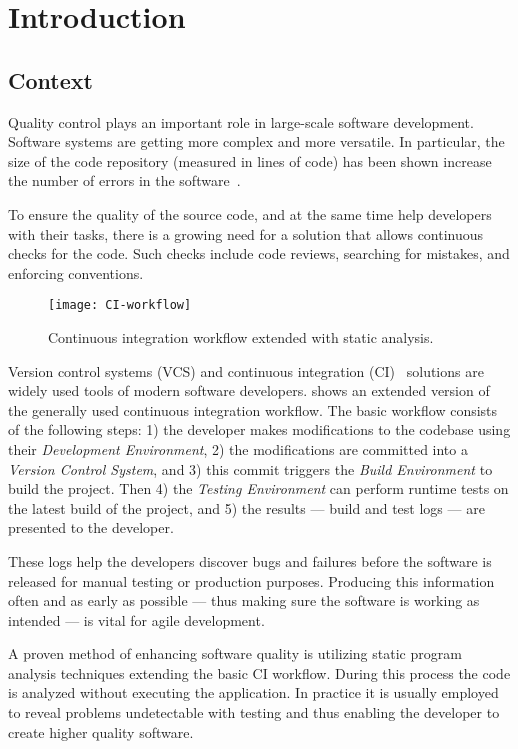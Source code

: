 \chapter{Introduction}
\label{chap:introduction}

\section{Context}
Quality control plays an important role in large-scale software development. Software systems are getting more complex and more versatile. In particular, the size of the code repository (measured in lines of code) has been shown increase the number of errors in the software~\cite{DBLP:journals/isj/StamelosAOB02}.

To ensure the quality of the source code, and at the same time help developers with their tasks, there is a growing need for a solution that allows continuous checks for the code. Such checks include code reviews, searching for mistakes, and enforcing conventions.~\cite{Vasilescu:2015:QPO:2786805.2786850}

\begin{figure}[!ht]
	\centering
	\texttt{[image: CI-workflow]}
	\caption{Continuous integration workflow extended with static analysis.}
	\label{fig:CI-workflow}
\end{figure}

Version control systems (VCS) and continuous integration (CI)~\cite{CI} solutions are widely used tools of modern software developers.  shows an extended version of the generally used continuous integration workflow.
The basic workflow consists of the following steps: 1) the developer makes modifications to the codebase using their \textit{Development Environment}, 2) the modifications are committed into a \textit{Version Control System}, and 3) this commit triggers the \textit{Build Environment} to build the project. Then 4) the \textit{Testing Environment} can perform runtime tests on the latest build of the project, and 5) the results --- build and test logs --- are presented to the developer.

These logs help the developers discover bugs and failures before the software is released for manual testing or production purposes. Producing this information often and as early as possible --- thus making sure the software is working as intended --- is vital for agile development.

A proven method of enhancing software quality is utilizing static program analysis techniques extending the basic CI workflow. During this process the code is analyzed without executing the application. In practice it is usually employed to reveal problems undetectable with testing and thus enabling the developer to create higher quality software.



